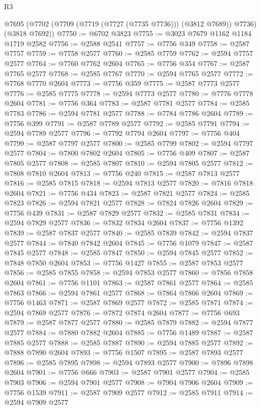 \begin{lexlean}{R3}
\begin{coremodule}
    @7695 (@7702 (@7709 (@7719 (@7727 (@7735 @7736))) (@3812 @7689)) @7736) (@3818 @7692))
@7750 := @6702 @3823
@7755 := @3023 @7679 @1162 @1184 @1719 @2582
@7756 := @2588 @2541
@7757 := @7756 @349
@7758 := @2587 @7757
@7759 := @7758 @2577
@7760 := @2585 @7759
@7762 := @2594 @7757 @2577
@7764 := @7760 @7762 @2604
@7765 := @7756 @354
@7767 := @2587 @7765 @2577
@7768 := @2585 @7767
@7770 := @2594 @7765 @2577
@7772 := @7768 @7770 @2604
@7773 := @7756 @359
@7775 := @2587 @7773 @2577
@7776 := @2585 @7775
@7778 := @2594 @7773 @2577
@7780 := @7776 @7778 @2604
@7781 := @7756 @364
@7783 := @2587 @7781 @2577
@7784 := @2585 @7783
@7786 := @2594 @7781 @2577
@7788 := @7784 @7786 @2604
@7789 := @7756 @399
@7791 := @2587 @7789 @2577
@7792 := @2585 @7791
@7794 := @2594 @7789 @2577
@7796 := @7792 @7794 @2604
@7797 := @7756 @404
@7799 := @2587 @7797 @2577
@7800 := @2585 @7799
@7802 := @2594 @7797 @2577
@7804 := @7800 @7802 @2604
@7805 := @7756 @409
@7807 := @2587 @7805 @2577
@7808 := @2585 @7807
@7810 := @2594 @7805 @2577
@7812 := @7808 @7810 @2604
@7813 := @7756 @240
@7815 := @2587 @7813 @2577
@7816 := @2585 @7815
@7818 := @2594 @7813 @2577
@7820 := @7816 @7818 @2604
@7821 := @7756 @434
@7823 := @2587 @7821 @2577
@7824 := @2585 @7823
@7826 := @2594 @7821 @2577
@7828 := @7824 @7826 @2604
@7829 := @7756 @439
@7831 := @2587 @7829 @2577
@7832 := @2585 @7831
@7834 := @2594 @7829 @2577
@7836 := @7832 @7834 @2604
@7837 := @7756 @1392
@7839 := @2587 @7837 @2577
@7840 := @2585 @7839
@7842 := @2594 @7837 @2577
@7844 := @7840 @7842 @2604
@7845 := @7756 @1079
@7847 := @2587 @7845 @2577
@7848 := @2585 @7847
@7850 := @2594 @7845 @2577
@7852 := @7848 @7850 @2604
@7853 := @7756 @1427
@7855 := @2587 @7853 @2577
@7856 := @2585 @7855
@7858 := @2594 @7853 @2577
@7860 := @7856 @7858 @2604
@7861 := @7756 @1101
@7863 := @2587 @7861 @2577
@7864 := @2585 @7863
@7866 := @2594 @7861 @2577
@7868 := @7864 @7866 @2604
@7869 := @7756 @1463
@7871 := @2587 @7869 @2577
@7872 := @2585 @7871
@7874 := @2594 @7869 @2577
@7876 := @7872 @7874 @2604
@7877 := @7756 @693
@7879 := @2587 @7877 @2577
@7880 := @2585 @7879
@7882 := @2594 @7877 @2577
@7884 := @7880 @7882 @2604
@7885 := @7756 @1489
@7887 := @2587 @7885 @2577
@7888 := @2585 @7887
@7890 := @2594 @7885 @2577
@7892 := @7888 @7890 @2604
@7893 := @7756 @1507
@7895 := @2587 @7893 @2577
@7896 := @2585 @7895
@7898 := @2594 @7893 @2577
@7900 := @7896 @7898 @2604
@7901 := @7756 @666
@7903 := @2587 @7901 @2577
@7904 := @2585 @7903
@7906 := @2594 @7901 @2577
@7908 := @7904 @7906 @2604
@7909 := @7756 @1539
@7911 := @2587 @7909 @2577
@7912 := @2585 @7911
@7914 := @2594 @7909 @2577

\end{coremodule}
\end{lexlean}
